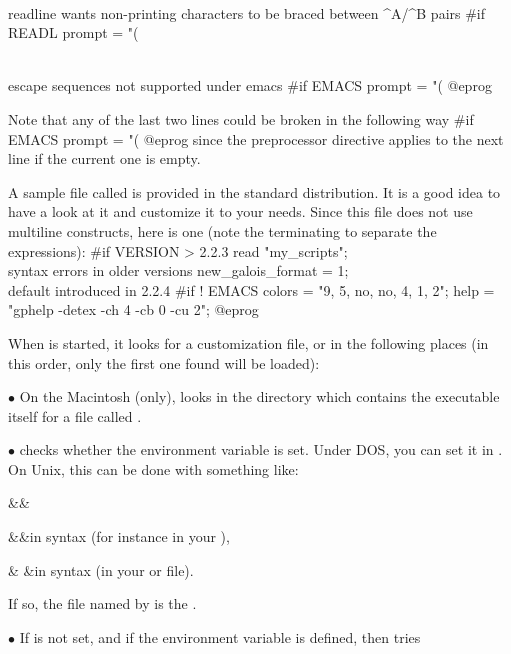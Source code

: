 \\ readline wants non-printing characters to be braced between ^A/^B pairs
#if READL prompt = "(%

\\ escape sequences not supported under emacs
#if EMACS prompt = "(%
@eprog

\noindent Note that any of the last two lines could be broken in the
following way
\bprog
#if EMACS
  prompt = "(%
@eprog
\noindent since the preprocessor directive applies to the next line if the
current one is empty.

A sample  file called  is provided in the
standard distribution. It is a good idea to have a look at it and customize
it to your needs. Since this file does not use multiline constructs, here is
one (note the terminating \kbd{;} to separate the expressions):
\bprog
#if VERSION > 2.2.3
{
  read "my_scripts";     \\ syntax errors in older versions
  new_galois_format = 1; \\ default introduced in 2.2.4
}
#if ! EMACS
{
  colors = "9, 5, no, no, 4, 1, 2";
  help   = "gphelp -detex -ch 4 -cb 0 -cu 2";
}
@eprog

When  is started, it looks for a customization file, or  in the
following places (in this order, only the first one found will be loaded):

\noindent$\bullet$ On the Macintosh (only),  looks in the directory
which contains the  executable itself for a file called .

\noindent$\bullet$  checks whether the environment variable
 is set. Under DOS, you can set it in . On Unix,
this can be done with something like: \smallskip

\settabs\+\indent&\quad&\cr

\+&\quad&in  syntax
(for instance in your ),\cr

\+& &in  syntax
(in your  or  file).\cr

\noindent If so, the file named by  is the .

\noindent$\bullet$ If  is not set, and if the environment variable
 is defined,  then tries

